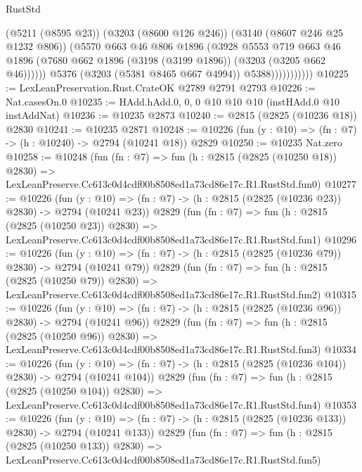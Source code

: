 \begin{lexlean}{RustStd}
\begin{coremodule}
                            (@5211 (@8595 @23))
                            (@3203 (@8600 @126 @246))
                            (@3140 (@8607 @246 @25 @1232 @806))
                            (@5570
                              @663
                              @46
                              @806
                              @1896
                              (@3928
                                @5553
                                @719
                                @663
                                @46
                                @1896
                                (@7680 @662 @1896 (@3198 (@3199 @1896)) (@3203 (@3205 @662 @46))))))
                          @5376
                          (@3203 (@5381 @8465 @667 @4994))
                          @5388)))))))))))
@10225 := LexLeanPreservation.Rust.CrateOK @2789 @2791 @2793
@10226 := Nat.casesOn.{0}
@10235 := HAdd.hAdd.{0, 0, 0} @10 @10 @10 (instHAdd.{0} @10 instAddNat)
@10236 := @10235 @2873
@10240 := @2815 (@2825 (@10236 @18)) @2830
@10241 := @10235 @2871
@10248 := @10226 (fun (y : @10) => (fn : @7) -> (h : @10240) -> @2794 (@10241 @18)) @2829
@10250 := @10235 Nat.zero
@10258 := @10248
    (fun (fn : @7) =>
    fun (h : @2815 (@2825 (@10250 @18)) @2830) =>
    LexLeanPreserve.Cc613c0d4cdf00b8508ed1a73cd86e17c.R1.RustStd.fun0)
@10277 := @10226
    (fun (y : @10) => (fn : @7) -> (h : @2815 (@2825 (@10236 @23)) @2830) -> @2794 (@10241 @23))
    @2829
    (fun (fn : @7) =>
    fun (h : @2815 (@2825 (@10250 @23)) @2830) =>
    LexLeanPreserve.Cc613c0d4cdf00b8508ed1a73cd86e17c.R1.RustStd.fun1)
@10296 := @10226
    (fun (y : @10) => (fn : @7) -> (h : @2815 (@2825 (@10236 @79)) @2830) -> @2794 (@10241 @79))
    @2829
    (fun (fn : @7) =>
    fun (h : @2815 (@2825 (@10250 @79)) @2830) =>
    LexLeanPreserve.Cc613c0d4cdf00b8508ed1a73cd86e17c.R1.RustStd.fun2)
@10315 := @10226
    (fun (y : @10) => (fn : @7) -> (h : @2815 (@2825 (@10236 @96)) @2830) -> @2794 (@10241 @96))
    @2829
    (fun (fn : @7) =>
    fun (h : @2815 (@2825 (@10250 @96)) @2830) =>
    LexLeanPreserve.Cc613c0d4cdf00b8508ed1a73cd86e17c.R1.RustStd.fun3)
@10334 := @10226
    (fun (y : @10) => (fn : @7) -> (h : @2815 (@2825 (@10236 @104)) @2830) -> @2794 (@10241 @104))
    @2829
    (fun (fn : @7) =>
    fun (h : @2815 (@2825 (@10250 @104)) @2830) =>
    LexLeanPreserve.Cc613c0d4cdf00b8508ed1a73cd86e17c.R1.RustStd.fun4)
@10353 := @10226
    (fun (y : @10) => (fn : @7) -> (h : @2815 (@2825 (@10236 @133)) @2830) -> @2794 (@10241 @133))
    @2829
    (fun (fn : @7) =>
    fun (h : @2815 (@2825 (@10250 @133)) @2830) =>
    LexLeanPreserve.Cc613c0d4cdf00b8508ed1a73cd86e17c.R1.RustStd.fun5)

\end{coremodule}
\end{lexlean}
